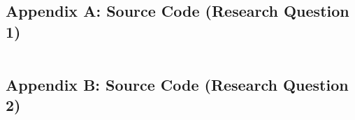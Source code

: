 \documentclass[12pt,bibliography=totocnumbered]{scrartcl}
\begin{document}
\subsection{Appendix A: Source Code (Research Question 1)}\label{appendix:ap1}
\inputminted[frame=lines,framesep=2mm,baselinestretch=1.2]{python}{../rq1_main.py}

\subsection{Appendix B: Source Code (Research Question 2)}\label{appendix:ap2}
\inputminted[frame=lines,framesep=2mm,baselinestretch=1.2]{python}{../rq2_main.py}
\end{document}
